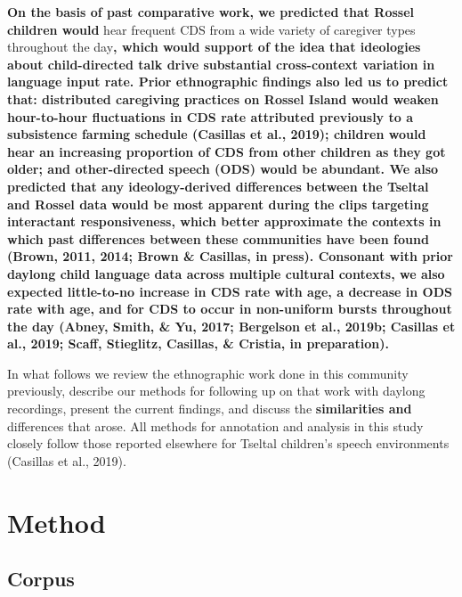 \documentclass[,man,floatsintext]{apa6}
\begin{document}
\textbf{On the basis of past comparative work, we predicted that Rossel
children would} hear frequent CDS from a wide variety of caregiver types
throughout the day\textbf{, which would support of the idea that
ideologies about child-directed talk drive substantial cross-context
variation in language input rate. Prior ethnographic findings also led
us to predict that: distributed caregiving practices on Rossel Island
would weaken hour-to-hour fluctuations in CDS rate attributed previously
to a subsistence farming schedule (Casillas et al., 2019); children
would hear an increasing proportion of CDS from other children as they
got older; and other-directed speech (ODS) would be abundant. We also
predicted that any ideology-derived differences between the Tseltal and
Rossel data would be most apparent during the clips targeting
interactant responsiveness, which better approximate the contexts in
which past differences between these communities have been found (Brown,
2011, 2014; Brown \& Casillas, in press). Consonant with prior daylong
child language data across multiple cultural contexts, we also expected
little-to-no increase in CDS rate with age, a decrease in ODS rate with
age, and for CDS to occur in non-uniform bursts throughout the day
(Abney, Smith, \& Yu, 2017; Bergelson et al., 2019b; Casillas et al.,
2019; Scaff, Stieglitz, Casillas, \& Cristia, in preparation).}

In what follows we review the ethnographic work done in this community
previously, describe our methods for following up on that work with
daylong recordings, present the current findings, and discuss the
\textbf{similarities and }differences that arose. All methods for
annotation and analysis in this study closely follow those reported
elsewhere for Tseltal children's speech environments (Casillas et al.,
2019).

\section{Method}\label{methods}

\subsection{Corpus}\label{methods-dataset}
\end{document}
